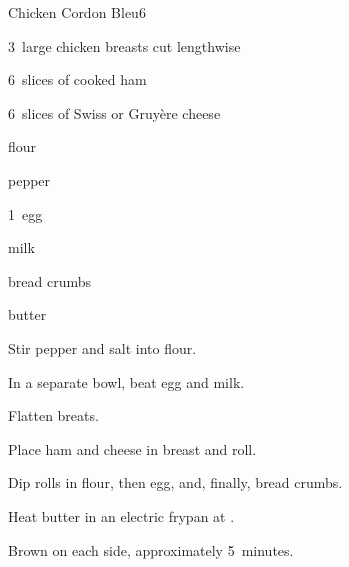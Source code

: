 \begin{recipe}{Chicken Cordon Bleu}{}{6}

\begin{ingredients}
\item 3~large chicken breasts cut lengthwise
\item 6~slices of cooked ham
\item 6~slices of Swiss or Gruy\`ere cheese
\item \C{\quarter} flour
\item {}
\item pepper
\item 1~egg
\item {} milk
\item {} bread crumbs
\item {} butter
\end{ingredients}

\begin{directions}
\item Stir pepper and salt into flour.
\item In a separate bowl, beat egg and milk.
\item Flatten breats.
\item Place ham and cheese in breast and roll.
\item Dip rolls in flour, then egg, and, finally, bread crumbs.
\item Heat butter in an electric frypan at .
\item Brown on each side, approximately 5~minutes.
\end{directions}

\end{recipe}
